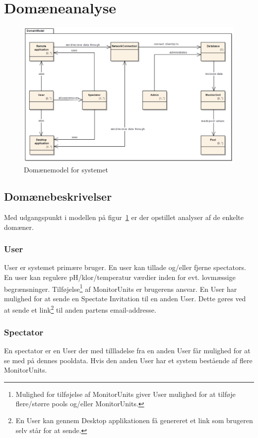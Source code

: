 \section{Domæneanalyse}

\begin{figure}
\centering
\includegraphics[width=\linewidth]{figs/domainModel}
\caption{Domænemodel for systemet}
\label{fig:domainModel}
\end{figure}

\subsection{Domænebeskrivelser}
Med udgangspunkt i modellen på figur~\ref{fig:domainModel} er der opstillet analyser af de enkelte domæner.

\subsubsection{User}
User er systemet primære bruger. En user kan tillade og/eller fjerne spectators. En user kan regulere pH/klor/temperatur værdier inden for evt. lovmæssige begrænsninger. Tilføjelse\footnote{Mulighed for tilføjelse af  MonitorUnits giver User mulighed for at tilføje flere/større pools og/eller MonitorUnits.} af MonitorUnits er brugerens ansvar. En User har mulighed for at sende en Spectate Invitation til en anden User. Dette gøres ved at sende et link\footnote{En User kan gennem Desktop applikationen få genereret et link som brugeren selv står for at sende.}  til anden partens email-addresse.

\subsubsection{Spectator}
En spectator er en User der med tillladelse fra en anden User får mulighed for at se med på dennes pooldata. Hvis den anden User har et system bestående af flere MonitorUnits.

